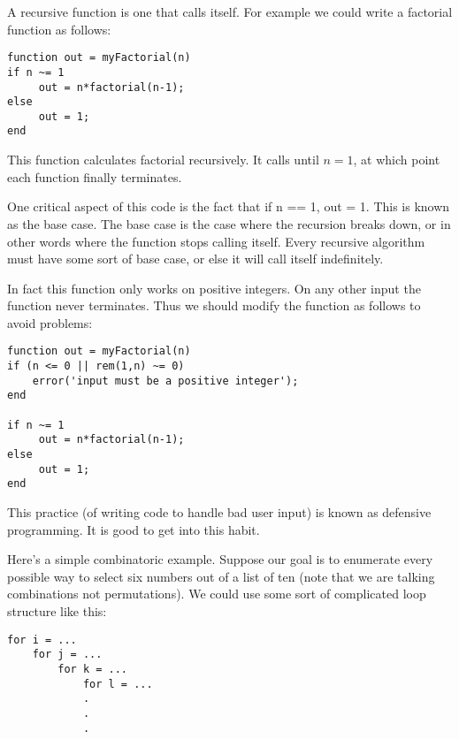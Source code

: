 

A recursive function is one that calls itself. For example we could write a factorial function as follows:

\begin{lstlisting}[style=matlab]
function out = myFactorial(n)
if n ~= 1
     out = n*factorial(n-1);
else
     out = 1;
end
\end{lstlisting}

This function calculates factorial recursively. It calls  until $n = 1$, at which point each function finally terminates.

One critical aspect of this code is the fact that if n == 1, out = 1. This is known as the base case. The base case is the case where the recursion breaks down, or in other words where the function stops calling itself. Every recursive algorithm must have some sort of base case, or else it will call itself indefinitely.

In fact this function only works on positive integers. On any other input the function never terminates. Thus we should modify the function as follows to avoid problems:

\begin{lstlisting}[style=matlab]
function out = myFactorial(n)
if (n <= 0 || rem(1,n) ~= 0)
	error('input must be a positive integer');
end
	
if n ~= 1
     out = n*factorial(n-1);
else
     out = 1;
end
\end{lstlisting}

This practice (of writing code to handle bad user input) is known as defensive programming. It is good to get into this habit.

Here's a simple combinatoric example. Suppose our goal is to enumerate every possible way to select six numbers out of a list of ten (note that we are talking combinations not permutations). We could use some sort of complicated  loop structure like this:

\begin{lstlisting}[style=matlab]
for i = ...
    for j = ...
        for k = ...
            for l = ...
            .
            .
            .
\end{lstlisting}

